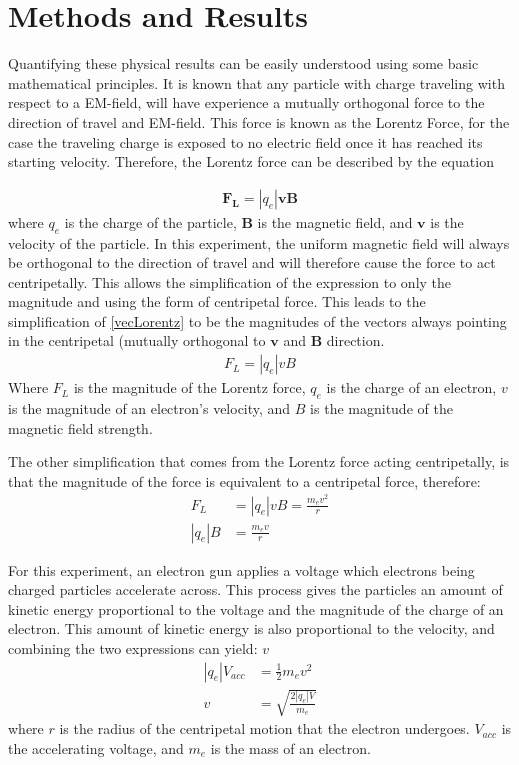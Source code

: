 \documentclass[%
 reprint,
 amsmath,amssymb,
 aps,
]{revtex4-2}
\begin{document}
\section{Methods and Results}
Quantifying these physical results can be easily understood using some basic mathematical principles. 
It is known that any particle with charge traveling with respect to a EM-field, will have experience a mutually orthogonal force to the direction of travel and EM-field. This force is known as the Lorentz Force, for the case the traveling charge is exposed to no electric field once it has reached its starting velocity. Therefore, the Lorentz force can be described by the equation

\begin{align}
     \boldsymbol{F_L} = |q_e|\boldsymbol{v}\boldsymbol{B}
     \label{vecLorentz}
\end{align}
where $q_e$ is the charge of the particle, $\boldsymbol{B}$ is the magnetic field, and $\boldsymbol{v}$ is the velocity of the particle.
In this experiment, the uniform magnetic field will always be orthogonal to the direction of travel and will therefore cause the force to act centripetally. 
This allows the simplification of the expression to only the magnitude and using the form of centripetal force. This leads to the simplification of \eqref{vecLorentz} to be the magnitudes of the vectors always pointing in the centripetal (mutually orthogonal to $\boldsymbol{v}$ and $\boldsymbol{B}$ direction.
\begin{align}
   {F_L} = |q_e|{v}{B}
   \label{magLorentz}
\end{align}
Where $F_L$ is the magnitude of the Lorentz force, $q_e$ is the charge of an electron, $v$ is the magnitude of an electron's velocity, and $B$ is the magnitude of the magnetic field strength. 

The other simplification that comes from the Lorentz force acting centripetally, is that the magnitude of the force is equivalent to a centripetal force, therefore:
\begin{align}
    F_L &= |q_e|vB = \frac{m_ev^2}{r} \\
    |q_e|B &= \frac{m_ev}{r}   
\end{align}

 
For this experiment, an electron gun applies a voltage which electrons being charged particles accelerate across. This process gives the particles an amount of kinetic energy proportional to the voltage and the magnitude of the charge of an electron. This amount of kinetic energy is also proportional to the velocity, and combining the two expressions can yield: $v$
\begin{align}
    |q_e|V_{acc} &= \frac{1}{2}m_ev^2 \\
    v &= \sqrt{\frac{2|q_e|V}{m_e}}
\end{align}
where $r$ is the radius of the centripetal motion that the electron undergoes. $V_{acc}$ is the accelerating voltage, and $m_e$ is the mass of an electron. 
\end{document}
